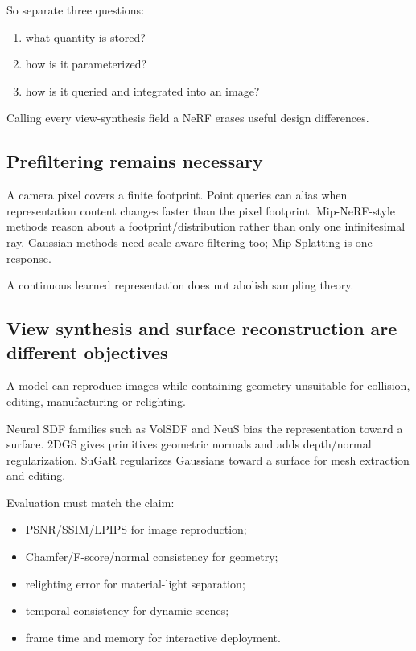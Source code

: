 So separate three questions:

\begin{enumerate}
\def\labelenumi{\arabic{enumi}.}
\tightlist
\item
  what quantity is stored?
\item
  how is it parameterized?
\item
  how is it queried and integrated into an image?
\end{enumerate}

Calling every view-synthesis field a NeRF erases useful design differences.

\subsection{Prefiltering remains necessary}\label{04-visual-computing-ii-ch035-prefiltering-remains-necessary}

A camera pixel covers a finite footprint. Point queries can alias when representation content changes faster than the pixel footprint. Mip-NeRF-style methods reason about a footprint/distribution rather than only one infinitesimal ray. Gaussian methods need scale-aware filtering too; Mip-Splatting is one response.

A continuous learned representation does not abolish sampling theory.

\subsection{View synthesis and surface reconstruction are different objectives}\label{04-visual-computing-ii-ch035-view-synthesis-and-surface-reconstruction-are-different-objectives}

A model can reproduce images while containing geometry unsuitable for collision, editing, manufacturing or relighting.

Neural SDF families such as VolSDF and NeuS bias the representation toward a surface. 2DGS gives primitives geometric normals and adds depth/normal regularization. SuGaR regularizes Gaussians toward a surface for mesh extraction and editing.

Evaluation must match the claim:

\begin{itemize}
\tightlist
\item
  PSNR/SSIM/LPIPS for image reproduction;
\item
  Chamfer/F-score/normal consistency for geometry;
\item
  relighting error for material-light separation;
\item
  temporal consistency for dynamic scenes;
\item
  frame time and memory for interactive deployment.
\end{itemize}

